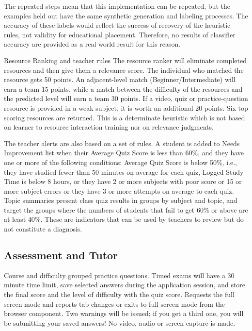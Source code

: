 \documentclass[conference]{IEEEtran}
\begin{document}
The repeated steps mean that this implementation can be repeated, but the examples held out have the same synthetic generation and labeling processes. The accuracy of these labels would reflect the success of recovery of the heuristic rules, not validity for educational placement. Therefore, no results of classifier accuracy are provided as a real world result for this reason.

Resource Ranking and teacher rules
The resource ranker will eliminate completed resources and then give them a relevance score. The individual who matched the resource gets 50 points. An adjacent-level match (Beginner/Intermediate) will earn a team 15 points, while a match between the difficulty of the resources and the predicted level will earn a team 30 points. If a video, quiz or practice-question resource is provided in a weak subject, it is worth an additional 20 points. Six top scoring resources are returned. This is a determinate heuristic which is not based on learner to resource interaction training nor on relevance judgments.

The teacher alerts are also based on a set of rules. A student is added to Needs Improvement list when their Average Quiz Score is less than 60\%, and they have one or more of the following conditions: Average Quiz Score is below 50\%, i.e., they have studied fewer than 50 minutes on average for each quiz, Logged Study Time is below 8 hours, or they have 2 or more subjects with poor score or 15 or more subject errors or they have 3 or more attempts on average to each quiz. Topic summaries present class quiz results in groups by subject and topic, and target the groups where the numbers of students that fail to get 60\% or above are at least 40\%. These are indicators that can be used by teachers to review but do not constitute a diagnosis.

\subsection{Assessment and Tutor}
Course and difficulty grouped practice questions. Timed exams will have a 30 minute time limit, save selected answers during the application session, and store the final score and the level of difficulty with the quiz score. Requests the full screen mode and reports tab changes or exits to full screen mode from the browser component. Two warnings will be issued; if you get a third one, you will be submitting your saved answers! No video, audio or screen capture is made.
\end{document}
